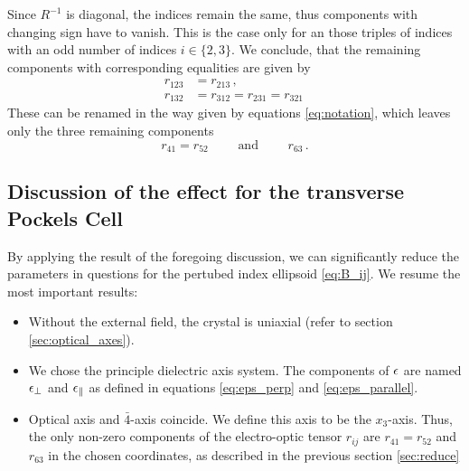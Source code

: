 Since $R^{-1}$ is diagonal, the indices remain the same, thus 
components with changing sign have to vanish. This is the case 
only for an those triples of indices with an 
odd number of indices $i \in \{2, 3\}$. We conclude, that 
the remaining components with corresponding equalities are given by
\begin{align*}
    r_{123} &=  r_{213}\, , \\
    r_{132} &=  r_{312} = r_{231} = r_{321}\,
\end{align*}
These can be renamed in the way given by equations \eqref{eq:notation}, 
which leaves only the three remaining components
\begin{equation}
    r_{41} = r_{52} \qquad \text{ and } \qquad  r_{63}\, .
\end{equation}

\subsection{Discussion of the effect for the transverse Pockels Cell}
By applying the result of the foregoing discussion, we can significantly 
reduce the parameters in questions for the pertubed index ellipsoid
\eqref{eq:B_ij}. We resume the most important results:
\begin{itemize}
    \item
    Without the external field, the crystal is uniaxial 
    (refer to section \ref{sec:optical_axes}).
    \item
    We chose the principle dielectric axis system. The 
    components of $\epsilon$ are named $\epsilon_\perp$ and 
    $\epsilon_\parallel$ as defined in equations 
    \eqref{eq:eps_perp} and \eqref{eq:eps_parallel}.  
    \item
    Optical axis and $\bar{4}$-axis coincide. We define 
    this axis to be the $x_3$-axis. Thus, the 
    only non-zero components of the electro-optic tensor 
    $r_{ij}$ are $r_{41} = r_{52}$ and $r_{63}$ in the 
    chosen coordinates, as described in the previous section 
    \ref{sec:reduce}
\end{itemize}



